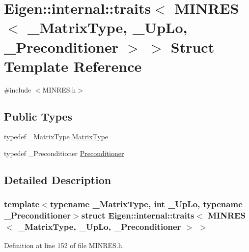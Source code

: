 \hypertarget{struct_eigen_1_1internal_1_1traits_3_01_m_i_n_r_e_s_3_01___matrix_type_00_01___up_lo_00_01___preconditioner_01_4_01_4}{}\section{Eigen\+:\+:internal\+:\+:traits$<$ M\+I\+N\+R\+E\+S$<$ \+\_\+\+Matrix\+Type, \+\_\+\+Up\+Lo, \+\_\+\+Preconditioner $>$ $>$ Struct Template Reference}
\label{struct_eigen_1_1internal_1_1traits_3_01_m_i_n_r_e_s_3_01___matrix_type_00_01___up_lo_00_01___preconditioner_01_4_01_4}


{\ttfamily \#include $<$M\+I\+N\+R\+E\+S.\+h$>$}

\subsection*{Public Types}
\begin{DoxyCompactItemize}
\item 
typedef \+\_\+\+Matrix\+Type \hyperlink{struct_eigen_1_1internal_1_1traits_3_01_m_i_n_r_e_s_3_01___matrix_type_00_01___up_lo_00_01___preconditioner_01_4_01_4_a3691fee920b886dd88c999822c6e9e5c}{Matrix\+Type}
\item 
typedef \+\_\+\+Preconditioner \hyperlink{struct_eigen_1_1internal_1_1traits_3_01_m_i_n_r_e_s_3_01___matrix_type_00_01___up_lo_00_01___preconditioner_01_4_01_4_a3f3f17b775bea08e709a72ed320f9e91}{Preconditioner}
\end{DoxyCompactItemize}


\subsection{Detailed Description}
\subsubsection*{template$<$typename \+\_\+\+Matrix\+Type, int \+\_\+\+Up\+Lo, typename \+\_\+\+Preconditioner$>$struct Eigen\+::internal\+::traits$<$ M\+I\+N\+R\+E\+S$<$ \+\_\+\+Matrix\+Type, \+\_\+\+Up\+Lo, \+\_\+\+Preconditioner $>$ $>$}



Definition at line 152 of file M\+I\+N\+R\+E\+S.\+h.



